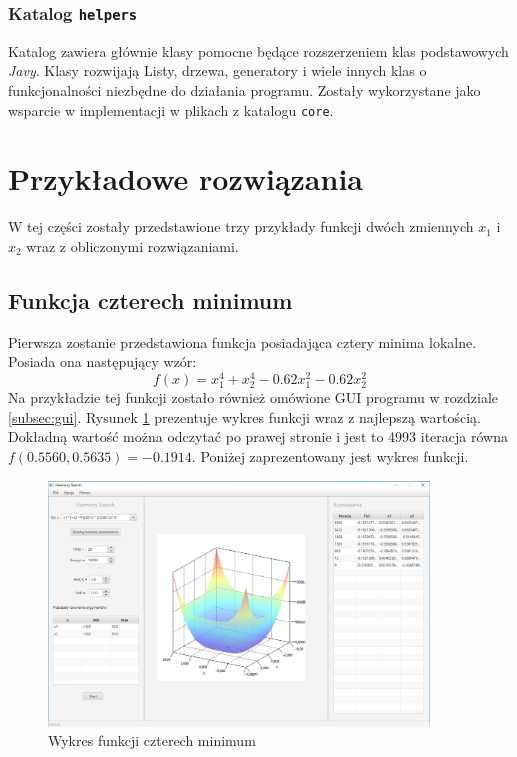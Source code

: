 \documentclass[10pt, a4paper]{article}
\begin{document}
\subsubsection{Katalog {\tt helpers}}
\label{subsubsec:helpers}
Katalog zawiera głównie klasy pomocne będące rozszerzeniem klas podstawowych {\em Javy}. Klasy rozwijają Listy, drzewa, generatory i wiele innych klas o funkcjonalności niezbędne do działania programu. Zostały wykorzystane jako wsparcie w implementacji w plikach z katalogu {\tt core}.

\section{Przykładowe rozwiązania}
\label{sec:przyklady}
W tej części zostały przedstawione trzy przykłady funkcji dwóch zmiennych {\em $x_{1}$} i {\em $x_{2}$} wraz z obliczonymi rozwiązaniami.

\subsection{Funkcja czterech minimum}
\label{subsec:fcn4min}
Pierwsza zostanie przedstawiona funkcja posiadająca cztery minima lokalne. Posiada ona następujący wzór: $$f(x) = x_{1}^{4}+x_{2}^{4}-0.62x_{1}^{2}-0.62x_{2}^{2} $$ Na przykładzie tej funkcji zostało również omówione GUI programu w rozdziale \ref{subsec:gui}. Rysunek \ref{fig:4} prezentuje wykres funkcji wraz z najlepszą wartością. Dokładną wartość można odczytać po prawej stronie i jest to 4993 iteracja równa $f(0.5560,0.5635) = -0.1914$. Poniżej zaprezentowany jest wykres funkcji. 
\begin{figure}[htbp]
	\centering
		\includegraphics[width=0.90\textwidth]{images/3.PNG}
		\caption{Wykres funkcji czterech minimum}
		\label{fig:4}
\end{figure}
\end{document}
